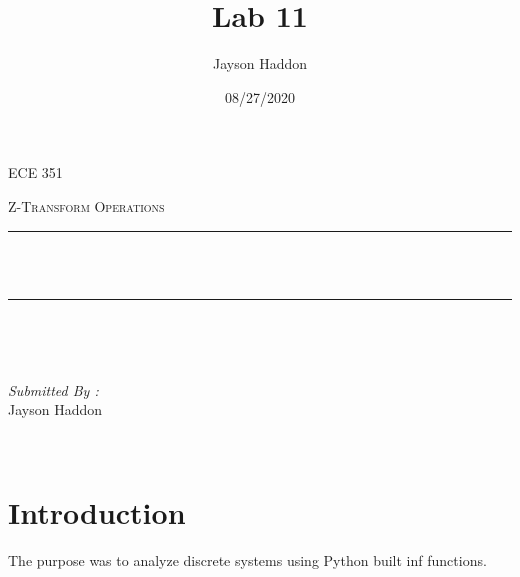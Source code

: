 \documentclass[11pt,a4]{report}
\title{Lab 11}
\author{Jayson Haddon}
\date{08/27/2020}
\makeatletter
\let\thetitle\@title
\makeatother
\begin{document}

\begin{titlepage}
	\centering
    \vspace*{0.5 cm}
\begin{center}    \textsc{\Large   ECE 351 }\\[2.0 cm]	\end{center}%
	\textsc{\Large Z-Transform Operations  }\\[0.5 cm]				%
	\rule{\linewidth}{0.2 mm} \\[0.4 cm]
	{ \huge \bfseries \thetitle}\\
	\rule{\linewidth}{0.2 mm} \\[1.5 cm]
	
	\begin{minipage}{0.4\textwidth}
		\begin{flushleft} \large
			\end{flushleft}
			\end{minipage}~
			\begin{minipage}{0.4\textwidth}
            
			\begin{flushright} \large
			\emph{Submitted By :} \\
			Jayson Haddon  
		\end{flushright}
           
	\end{minipage}\\[2 cm]
	
    
    
    
    
	
\end{titlepage}

\tableofcontents
\pagebreak

\renewcommand{\thesection}{\arabic{section}}
\section{Introduction}
The purpose was to analyze discrete systems using Python built inf functions.  
\end{document}
